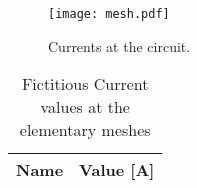 \begin{figure}[ht] \centering
    \texttt{[image: mesh.pdf]}
    \caption{Currents at the circuit.}
    \label{fig:mesh}
\end{figure}

\begin{table}[ht]
  \centering
  \begin{tabular}{|l|r|}
    \hline    
    {\bf Name} & {\bf Value [A]} \\ \hline
    
  \end{tabular}
  \caption{Fictitious Current values at the elementary meshes}
  \label{tab:SolveMalhas_tab}
\end{table}




